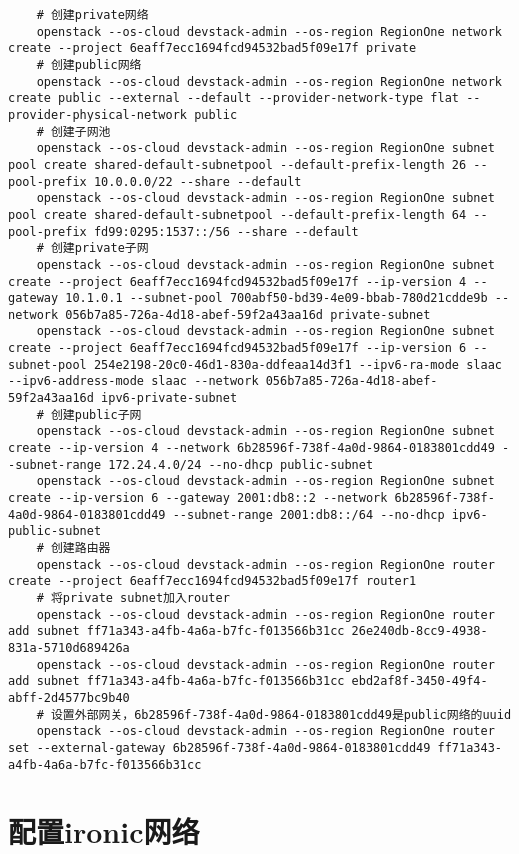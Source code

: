 \documentclass[a4paper,left=2.5cm,right=2.5cm,11pt]{article}
\begin{document}
	\begin{lstlisting}
	# 创建private网络
	openstack --os-cloud devstack-admin --os-region RegionOne network create --project 6eaff7ecc1694fcd94532bad5f09e17f private
	# 创建public网络
	openstack --os-cloud devstack-admin --os-region RegionOne network create public --external --default --provider-network-type flat --provider-physical-network public
	# 创建子网池
	openstack --os-cloud devstack-admin --os-region RegionOne subnet pool create shared-default-subnetpool --default-prefix-length 26 --pool-prefix 10.0.0.0/22 --share --default
	openstack --os-cloud devstack-admin --os-region RegionOne subnet pool create shared-default-subnetpool --default-prefix-length 64 --pool-prefix fd99:0295:1537::/56 --share --default
	# 创建private子网
	openstack --os-cloud devstack-admin --os-region RegionOne subnet create --project 6eaff7ecc1694fcd94532bad5f09e17f --ip-version 4 --gateway 10.1.0.1 --subnet-pool 700abf50-bd39-4e09-bbab-780d21cdde9b --network 056b7a85-726a-4d18-abef-59f2a43aa16d private-subnet
	openstack --os-cloud devstack-admin --os-region RegionOne subnet create --project 6eaff7ecc1694fcd94532bad5f09e17f --ip-version 6 --subnet-pool 254e2198-20c0-46d1-830a-ddfeaa14d3f1 --ipv6-ra-mode slaac --ipv6-address-mode slaac --network 056b7a85-726a-4d18-abef-59f2a43aa16d ipv6-private-subnet
	# 创建public子网
	openstack --os-cloud devstack-admin --os-region RegionOne subnet create --ip-version 4 --network 6b28596f-738f-4a0d-9864-0183801cdd49 --subnet-range 172.24.4.0/24 --no-dhcp public-subnet
	openstack --os-cloud devstack-admin --os-region RegionOne subnet create --ip-version 6 --gateway 2001:db8::2 --network 6b28596f-738f-4a0d-9864-0183801cdd49 --subnet-range 2001:db8::/64 --no-dhcp ipv6-public-subnet
	# 创建路由器
	openstack --os-cloud devstack-admin --os-region RegionOne router create --project 6eaff7ecc1694fcd94532bad5f09e17f router1
	# 将private subnet加入router
	openstack --os-cloud devstack-admin --os-region RegionOne router add subnet ff71a343-a4fb-4a6a-b7fc-f013566b31cc 26e240db-8cc9-4938-831a-5710d689426a
	openstack --os-cloud devstack-admin --os-region RegionOne router add subnet ff71a343-a4fb-4a6a-b7fc-f013566b31cc ebd2af8f-3450-49f4-abff-2d4577bc9b40
	# 设置外部网关，6b28596f-738f-4a0d-9864-0183801cdd49是public网络的uuid
	openstack --os-cloud devstack-admin --os-region RegionOne router set --external-gateway 6b28596f-738f-4a0d-9864-0183801cdd49 ff71a343-a4fb-4a6a-b7fc-f013566b31cc
	\end{lstlisting}

\section{配置ironic网络}
\end{document}
